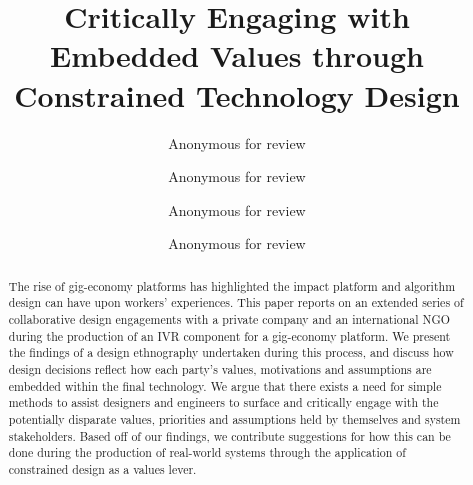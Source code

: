 \documentclass[acmlarge,screen]{acmart}
\begin{document}
\title{Critically Engaging with Embedded Values through Constrained Technology Design}

\author{Anonymous for review}

\author{Anonymous for review}

\author{Anonymous for review}

\author{Anonymous for review}

\renewcommand{\shortauthors}{Anon et al.}

\begin{abstract}
The rise of gig-economy platforms has highlighted the impact platform and algorithm design can have upon workers’ experiences. This paper reports on an extended series of collaborative design engagements with a private company and an international NGO during the production of an IVR component for a gig-economy platform. We present the findings of a design ethnography undertaken during this process, and discuss how design decisions reflect how each party’s values, motivations and assumptions are embedded within the final technology. We argue that there exists a need for simple methods to assist designers and engineers to surface and critically engage with the potentially disparate values, priorities and assumptions held by themselves and system stakeholders. Based off of our findings, we contribute suggestions for how this can be done during the production of real-world systems through the application of constrained design as a values lever.
\end{abstract}
\end{document}
